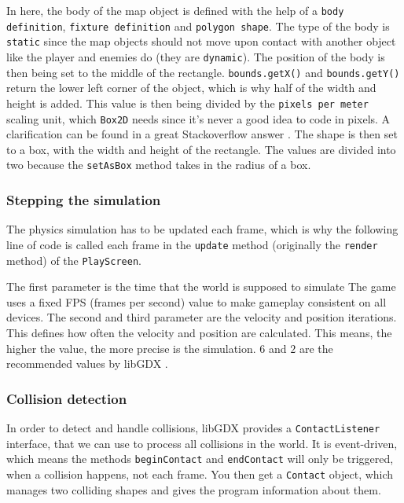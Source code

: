 \documentclass[12p]{article}
\begin{document}
In here, the body of the map object is defined with the help of a \texttt{body definition}, \texttt{fixture definition} and \texttt{polygon shape}. The type of the body is \texttt{static} since the map objects should not move upon contact with another object like the player and enemies do (they are \texttt{dynamic}). The position of the body is then being set to the middle of the rectangle. \texttt{bounds.getX()} and \texttt{bounds.getY()} return the lower left corner of the object, which is why half of the width and height is added. This value is then being divided by the \texttt{pixels per meter} scaling unit, which \texttt{Box2D} needs since it's never a good idea to code in pixels. A clarification can be found in a great Stackoverflow answer \cite{stackoverflowPPM}. The shape is then set to a box, with the width and height of the rectangle. The values are divided into two because the \texttt{setAsBox} method takes in the radius of a box.


\subsubsection{Stepping the simulation} \label{DocSteppingTheSimulation}

The physics simulation has to be updated each frame, which is why the following line of code is called each frame in the \texttt{update} method (originally the \texttt{render} method) of the \texttt{PlayScreen}.


The first parameter is the time that the world is supposed to simulate The game uses a fixed FPS (frames per second) value to make gameplay consistent on all devices. The second and third parameter are the velocity and position iterations. This defines how often the velocity and position are calculated. This means, the higher the value, the more precise is the simulation. $6$ and $2$ are the recommended values by libGDX \cite{stepValues}.


\subsubsection{Collision detection} \label{DocCollisionDetection}

In order to detect and handle collisions, libGDX provides a \texttt{ContactListener} interface, that we can use to process all collisions in the world. It is event-driven, which means the methods \texttt{beginContact} and \texttt{endContact} will only be triggered, when a collision happens, not each frame. You then get a \texttt{Contact} object, which manages two colliding shapes and gives the program information about them.
\end{document}
